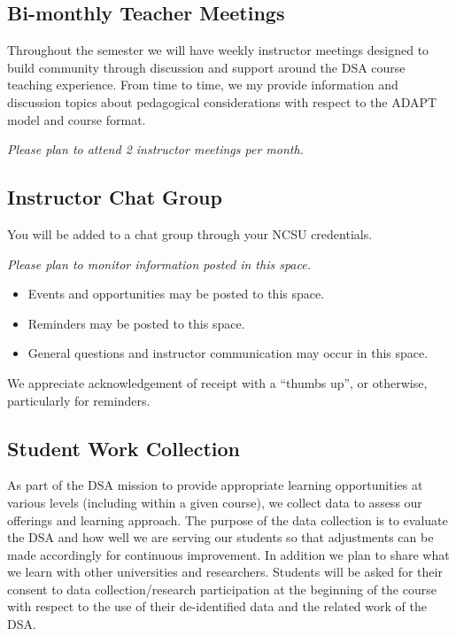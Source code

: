 \documentclass[
]{book}
\providecommand{\tightlist}{%
  \setlength{\itemsep}{0pt}\setlength{\parskip}{0pt}}
\begin{document}
\hypertarget{bi-monthly-teacher-meetings}{%
\subsection{Bi-monthly Teacher Meetings}\label{bi-monthly-teacher-meetings}}

Throughout the semester we will have weekly instructor meetings designed to build community through discussion and support around the DSA course teaching experience. From time to time, we my provide information and discussion topics about pedagogical considerations with respect to the ADAPT model and course format.

{ \emph{Please plan to attend 2 instructor meetings per month.} }

\hypertarget{instructor-chat-group}{%
\subsection{Instructor Chat Group}\label{instructor-chat-group}}

You will be added to a chat group through your NCSU credentials.

{ \emph{Please plan to monitor information posted in this space.} }

\begin{itemize}
\tightlist
\item
  Events and opportunities may be posted to this space.
\item
  Reminders may be posted to this space.
\item
  General questions and instructor communication may occur in this space.
\end{itemize}

We appreciate acknowledgement of receipt with a ``thumbs up'', or otherwise, particularly for reminders.

\hypertarget{student-work-collection}{%
\subsection{Student Work Collection}\label{student-work-collection}}

As part of the DSA mission to provide appropriate learning opportunities at various levels (including within a given course), we collect data to assess our offerings and learning approach. The purpose of the data collection is to evaluate the DSA and how well we are serving our students so that adjustments can be made accordingly for continuous improvement. In addition we plan to share what we learn with other universities and researchers. Students will be asked for their consent to data collection/research participation at the beginning of the course with respect to the use of their de-identified data and the related work of the DSA.
\end{document}
